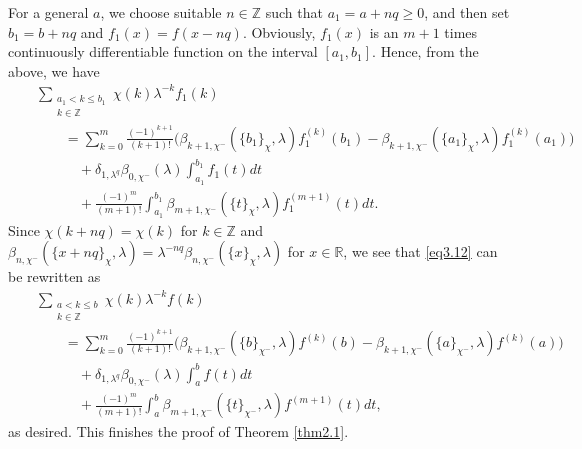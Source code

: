 \documentclass[reqno]{amsart}
\numberwithin{equation}{section}
\begin{document}
For a general $a$, we choose suitable $n\in\mathbb{Z}$ such that $a_{1}=a+nq\geqslant0$, and then set $b_{1}=b+nq$ and $f_{1}(x)=f(x-nq)$. Obviously, $f_{1}(x)$ is an $m+1$
times continuously differentiable function on the interval $[a_{1},b_{1}]$. Hence, from the above, we have
\begin{eqnarray}\label{eq3.12}
&&\sum_{\substack{a_{1}<k\leqslant b_{1}\\k\in\mathbb{Z}}}\chi(k)\lambda^{-k}f_{1}(k)\nonumber\\
&&\qquad=\sum_{k=0}^{m}\frac{(-1)^{k+1}}{(k+1)!}\bigl(\beta_{k+1,\chi^{-}}(\{b_{1}\}_{\chi},\lambda)f_{1}^{(k)}(b_{1})-\beta_{k+1,\chi^{-}}(\{a_{1}\}_{\chi},\lambda)f_{1}^{(k)}(a_{1})\bigl)\nonumber\\
&&\qquad\quad+\delta_{1,\lambda^{q}}\beta_{0,\chi^{-}}(\lambda)\int_{a_{1}}^{b_{1}}f_{1}(t)dt\nonumber\\
&&\qquad\quad+\frac{(-1)^{m}}{(m+1)!}\int_{a_{1}}^{b_{1}}\beta_{m+1,\chi^{-}}(\{t\}_{\chi},\lambda)f_{1}^{(m+1)}(t)dt.
\end{eqnarray}
Since $\chi(k+nq)=\chi(k)$ for $k\in\mathbb{Z}$ and $\beta_{n,\chi^{-}}(\{x+nq\}_{\chi},\lambda)=\lambda^{-nq}\beta_{n,\chi^{-}}(\{x\}_{\chi},\lambda)$ for $x\in\mathbb{R}$, we see that \eqref{eq3.12} can be rewritten as
\begin{eqnarray*}
&&\sum_{\substack{a<k\leqslant b\\k\in\mathbb{Z}}}\chi(k)\lambda^{-k}f(k)\nonumber\\
&&\qquad=\sum_{k=0}^{m}\frac{(-1)^{k+1}}{(k+1)!}\bigl(\beta_{k+1,\chi^{-}}(\{b\}_{\chi^{-}},\lambda)f^{(k)}(b)-\beta_{k+1,\chi^{-}}(\{a\}_{\chi^{-}},\lambda)f^{(k)}(a)\bigl)\nonumber\\
&&\qquad\quad+\delta_{1,\lambda^{q}}\beta_{0,\chi^{-}}(\lambda)\int_{a}^{b}f(t)dt\nonumber\\
&&\qquad\quad+\frac{(-1)^{m}}{(m+1)!}\int_{a}^{b}\beta_{m+1,\chi^{-}}(\{t\}_{\chi^{-}},\lambda)f^{(m+1)}(t)dt,
\end{eqnarray*}
as desired. This finishes the proof of Theorem \ref{thm2.1}.
\end{document}
